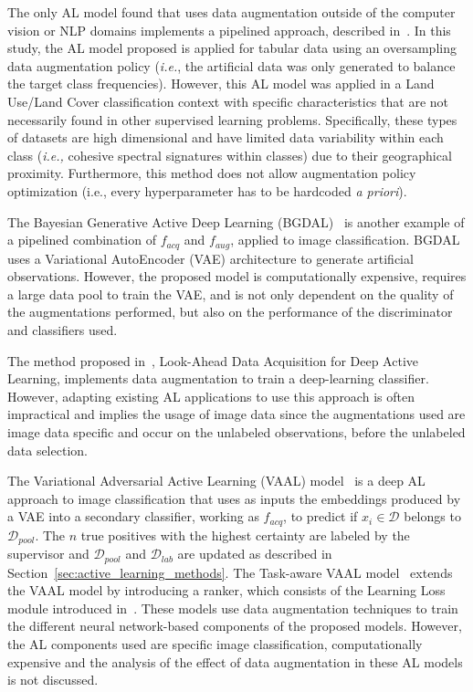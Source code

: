 \documentclass[10pt,journal,compsoc]{IEEEtran}
\begin{document}
The only AL model found that uses data augmentation outside of the computer
vision or NLP domains implements a pipelined approach, described
in~\cite{Fonseca2021}. In this study, the AL model proposed is applied for
tabular data using an oversampling data augmentation policy (\textit{i.e.},
the artificial data was only generated to balance the target class
frequencies). However, this AL model was applied in a Land Use/Land Cover
classification context with specific characteristics that are not necessarily
found in other supervised learning problems. Specifically, these types of
datasets are high dimensional and have limited data variability within each
class (\textit{i.e.,} cohesive spectral signatures within classes) due to
their geographical proximity. Furthermore, this method does not allow
augmentation policy optimization (i.e., every hyperparameter has to be
hardcoded \textit{a priori}).

The Bayesian Generative Active Deep Learning (BGDAL)~\cite{tran2019bayesian}
is another example of a pipelined combination of $f_{acq}$ and $f_{aug}$,
applied to image classification. BGDAL uses a Variational AutoEncoder (VAE)
architecture to generate artificial observations. However, the proposed model
is computationally expensive, requires a large data pool to train the VAE, and
is not only dependent on the quality of the augmentations performed, but also
on the performance of the discriminator and classifiers used.

The method proposed in~\cite{Kim2021}, Look-Ahead Data Acquisition for Deep
Active Learning, implements data augmentation to train a deep-learning
classifier. However, adapting existing AL applications to use this approach is
often impractical and implies the usage of image data since the augmentations
used are image data specific and occur on the unlabeled observations, before
the unlabeled data selection.

The Variational Adversarial Active Learning (VAAL)
model~\cite{sinha2019variational} is a deep AL approach to image
classification that uses as inputs the embeddings produced by a VAE into a
secondary classifier, working as $f_{acq}$, to predict if $x_i \in
\mathcal{D}$ belongs to $\mathcal{D}_{pool}$. The $n$ true positives with the
highest certainty are labeled by the supervisor and $\mathcal{D}_{pool}$ and
$\mathcal{D}_{lab}$ are updated as described in
Section~\ref{sec:active_learning_methods}. The Task-aware VAAL
model~\cite{kim2021task} extends the VAAL model by introducing a ranker, which
consists of the Learning Loss module introduced in~\cite{Yoo2019}. These
models use data augmentation techniques to train the different neural
network-based components of the proposed models. However, the AL components
used are specific image classification, computationally expensive and the
analysis of the effect of data augmentation in these AL models is not
discussed.
\end{document}
